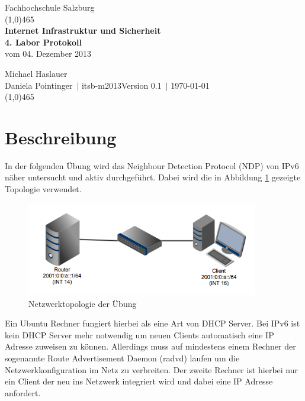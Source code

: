 \documentclass[a4paper,12pt]{article} %
\author{\theauthor\\\company}
\date{\thedate}
\title{\thetitle}
\def \theauthor  {Michael Haslauer\\Daniela Pointinger}
\def \thedate    {\today}
\def \thetitle   {Internet Infrastruktur und Sicherheit\\4. Labor Protokoll}
\def \subtitle   {vom 04. Dezember 2013}
\def \company    {Fachhochschule Salzburg}
\def \department {itsb-m2013}
\def \version    {0.1}
\begin{document}
\begin{titlepage}
\begin{center}
\Large\company\tiny\\
\textcolor{titlepagelinecolor}{\line(1,0){465}\\[1cm]}
\huge
\textbf{\thetitle}\\
\Large \subtitle\\[1cm]
\end{center}
\large
\theauthor\ $\mid$ \department\hfill Version \version\ $\mid$ \thedate\\[1cm]
\textcolor{titlepagelinecolor}{\line(1,0){465}\\[1cm]}
\end{titlepage}

\tableofcontents %

\newpage

\section{Beschreibung}
In der folgenden Übung wird das Neighbour Detection Protocol (NDP) von IPv6 näher untersucht und aktiv durchgeführt. Dabei wird die in Abbildung \ref{fig:topologie} gezeigte Topologie verwendet.
\begin{figure}[ht]
	\centering
		\includegraphics[width=0.90\textwidth]{img/lab04.png}
	\caption{Netzwerktopologie der Übung}
	\label{fig:topologie}
\end{figure}
Ein Ubuntu Rechner fungiert hierbei als eine Art von DHCP Server. Bei IPv6 ist kein DHCP Server mehr notwendig um neuen Clients automatisch eine IP Adresse zuweisen zu können. Allerdings muss auf mindestens einem Rechner der sogenannte Route Advertisement Daemon (radvd) laufen um die Netzwerkkonfiguration im Netz zu verbreiten. Der zweite Rechner ist hierbei nur ein Client der neu ins Netzwerk integriert wird und dabei eine IP Adresse anfordert.
\end{document}
